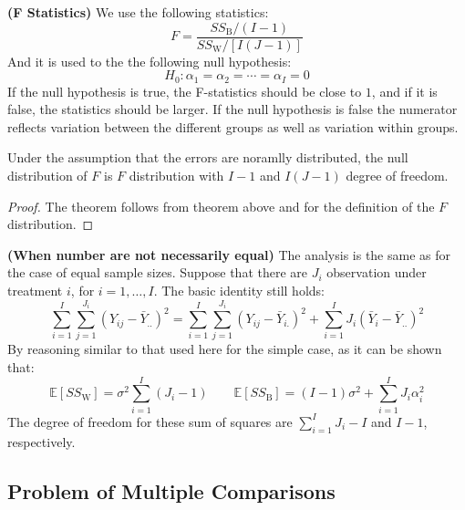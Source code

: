 \begin{definition}{\textbf{(F Statistics)}}
    We use the following statistics:
    \begin{equation*}
        F = \frac{SS_\text{B}/(I-1)}{SS_\text{W}/[I(J-1)]}
    \end{equation*}
    And it is used to the the following null hypothesis: 
    \begin{equation*}
        H_0 : \alpha_1 = \alpha_2 = \cdots = \alpha_I = 0
    \end{equation*}
    If the null hypothesis is true, the F-statistics should be close to $1$, and if it is false, the statistics should be larger. If the null hypothesis is false the numerator reflects variation between the different groups as well as variation within groups. 
\end{definition}

\begin{theorem}
    Under the assumption that the errors are noramlly distributed, the null distribution of $F$ is $F$ distribution with $I-1$ and $I(J-1)$ degree of freedom. 
\end{theorem}
\begin{proof}
    The theorem follows from theorem above and for the definition of the $F$ distribution. 
\end{proof}

\begin{remark}{\textbf{(When number are not necessarily equal)}}
    The analysis is the same as for the case of equal sample sizes. Suppose that there are $J_i$ observation under treatment $i$, for $i=1,\dots,I$. The basic identity still holds:
    \begin{equation*}
        \sum_{i=1}^I \sum^{J_i}_{j=1}(Y_{ij} - \bar{Y}_{..})^2 = \sum^I_{i=1}\sum^{J_i}_{j=1} (Y_{ij} - \bar{Y}_{i.})^2 + \sum^I_{i=1}J_i(\bar{Y}_i - \bar{Y}_{..})^2
    \end{equation*}
    By reasoning similar to that used here for the simple case, as it can be shown that:
    \begin{equation*}
        \mathbb{E}[SS_\text{W}] = \sigma^2\sum^I_{i=1}(J_i - 1) \qquad \mathbb{E}[SS_\text{B}] = (I-1)\sigma^2 + \sum^I_{i=1}J_i\alpha^2_i
    \end{equation*}
    The degree of freedom for these sum of squares are $\sum^I_{i=1}J_i - I$ and $I-1$, respectively. 
\end{remark}

\subsection{Problem of Multiple Comparisons}

